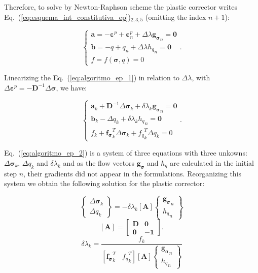 \documentclass[Journal,letterpaper]{ascelike-new}
\newcommand{\All}{\boldsymbol A}
\newcommand{\al}{\boldsymbol a}
\newcommand{\bl}{\boldsymbol b}
\newcommand{\dfds}{\boldsymbol{f_\sigma}}
\newcommand{\dfdq}{{f_q}}
\newcommand{\dgds}{\boldsymbol{g_\sigma}}
\newcommand{\Dsdee}{\boldsymbol{D}}
\newcommand{\hl}{{h_q}}
\newcommand{\onell}{\boldsymbol{1}}
\newcommand{\strainp}{\boldsymbol{\varepsilon}^{p}}
\newcommand{\stress}{\boldsymbol{\sigma}}
\newcommand{\zerol}{\boldsymbol 0}
\begin{document}
Therefore, to solve by Newton-Raphson scheme the plastic corrector writes Eq.~(\ref{eq:esquema_int_constitutiva_ep})$_{2,3,5}$ (omitting the index $n+1$):

\begin{equation}
	\label{eq:algoritmo_ep_1}
	\left\{
	\begin{array}{lcl}
		\al = -\strainp + \strainp_n + \Delta \lambda \dgds_n = \zerol	\\
		\bl = -q + q_n + \Delta\lambda\hl_n = \zerol \\
		f = f(\stress,q) = 0
	\end{array}
	\right..
\end{equation}

Linearizing the Eq.~(\ref{eq:algoritmo_ep_1}) in relation to $\Delta \lambda$, with $\Delta \strainp = - \Dsdee^{-1}\Delta\stress$, we have:

\begin{equation}
	\label{eq:algoritmo_ep_2}
	\left\{
	\begin{array}{lcl}
		\al_k + \Dsdee^{-1}\Delta\stress_k + \delta \lambda_k \dgds_n = \zerol \\
		\bl_k - \Delta q_k + \delta \lambda_k \hl_n = \zerol \\
		f_k + \dfds_k^T\Delta\stress_k + \dfdq_k^T \Delta q_k = 0
	\end{array}
	\right..
\end{equation}

Eq.~(\ref{eq:algoritmo_ep_2}) is a system of three equations with three unkowns: $\Delta \stress_k$, $\Delta q_k$ and $\delta \lambda_k$ and as the flow vectors $\dgds$ and $\hl$ are calculated in the initial step $n$, their gradients did not appear in the formulations. Reorganizing this system we obtain the following solution for the plastic corrector:

\begin{equation}
	\label{eq:algoritmo_ep_3}
	\left\{
	\begin{array}{lcl}
		\Delta \stress_k \\
		\Delta q_k
	\end{array}
	\right\} = -\delta\lambda_k \left[ \All \right]
	\left\{	
	\begin{array}{lcl}
		\dgds_n \\
		\hl_n
	\end{array}
	\right\}
\end{equation}
\begin{equation}
	\label{eq:Ak}
	\left[ \All \right] =
	\begin{bmatrix}
		\Dsdee & \zerol \\
		\zerol & -\onell
	\end{bmatrix}.
\end{equation}
\begin{equation}
	\label{eq:deltalambdak}
	\delta \lambda_k = \dfrac{f_k}{\left[\dfds_k^T~~~~\dfdq_k^T\right]\left[\All \right]\left\{ 
		\begin{array}{lcl}
			\dgds_n \\ 
			\hl_n
		\end{array}\right\}}
\end{equation}
\end{document}
